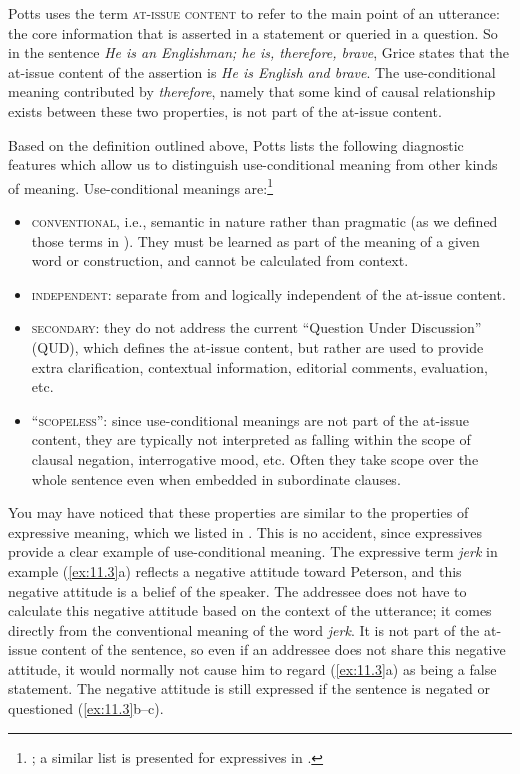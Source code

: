 Potts uses the term \textsc{at-issue content} to refer to the main point of an utterance: the core information that is asserted in a statement or queried in a question. So in the sentence \textit{He is an Englishman; he is, therefore, brave}, Grice states that the at-issue content of the assertion is \textit{He is English and brave}. The use-conditional meaning contributed by \textit{therefore}, namely that some kind of causal relationship exists between these two properties, is not part of the at-issue content.



Based on the definition outlined above, Potts lists the following diagnostic features which allow us to distinguish use-conditional meaning from other kinds of meaning. Use-conditional meanings are:\footnote{\citet{Potts2015}; a similar list is presented for expressives in \citet{Potts2007c}.}

\begin{itemize}
\item \textsc{conventional}, i.e., semantic in nature rather than pragmatic (as we defined those terms in ). They must be learned as part of the meaning of a given word or construction, and cannot be calculated from context.

\item \textsc{independent}: separate from and logically independent of the at-issue content.

\item \textsc{secondary}: they do not address the current “Question Under Discussion” (QUD), which defines the at-issue content, but rather are used to provide extra clarification, contextual information, editorial comments, evaluation, etc.

\item \textsc{“scopeless”:} since use-conditional meanings are not part of the at-issue content, they are typically not interpreted as falling within the scope of clausal negation, interrogative mood, etc. Often they take scope over the whole sentence even when embedded in subordinate clauses.
\end{itemize}


You may have noticed that these properties are similar to the properties of expressive meaning, which we listed in . This is no accident, since expressives provide a clear example of use-conditional meaning. The expressive term \textit{jerk} in example (\ref{ex:11.3}a) reflects a negative attitude toward Peterson, and this negative attitude is a belief of the speaker. The addressee does not have to calculate this negative attitude based on the context of the utterance; it comes directly from the conventional meaning of the word \textit{jerk}. It is not part of the at-issue content of the sentence, so even if an addressee does not share this negative attitude, it would normally not cause him to regard (\ref{ex:11.3}a) as being a false statement. The negative attitude is still expressed if the sentence is negated or questioned (\ref{ex:11.3}b--c).


